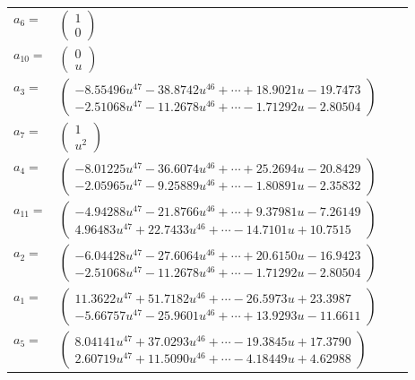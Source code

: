 \documentclass[1p]{elsarticle_modified}
\theoremstyle{definition}
\begin{document}
\begin{tabular}{m{7pt} m{180pt} m{7pt} m{180pt} }
\flushright $a_{6}=$&$\begin{pmatrix}1\\0\end{pmatrix}$ \\
\flushright $a_{10}=$&$\begin{pmatrix}0\\u\end{pmatrix}$ \\
\flushright $a_{3}=$&$\begin{pmatrix}-8.55496 u^{47}-38.8742 u^{46}+\cdots+18.9021 u-19.7473\\-2.51068 u^{47}-11.2678 u^{46}+\cdots-1.71292 u-2.80504\end{pmatrix}$ \\
\flushright $a_{7}=$&$\begin{pmatrix}1\\u^2\end{pmatrix}$ \\
\flushright $a_{4}=$&$\begin{pmatrix}-8.01225 u^{47}-36.6074 u^{46}+\cdots+25.2694 u-20.8429\\-2.05965 u^{47}-9.25889 u^{46}+\cdots-1.80891 u-2.35832\end{pmatrix}$ \\
\flushright $a_{11}=$&$\begin{pmatrix}-4.94288 u^{47}-21.8766 u^{46}+\cdots+9.37981 u-7.26149\\4.96483 u^{47}+22.7433 u^{46}+\cdots-14.7101 u+10.7515\end{pmatrix}$ \\
\flushright $a_{2}=$&$\begin{pmatrix}-6.04428 u^{47}-27.6064 u^{46}+\cdots+20.6150 u-16.9423\\-2.51068 u^{47}-11.2678 u^{46}+\cdots-1.71292 u-2.80504\end{pmatrix}$ \\
\flushright $a_{1}=$&$\begin{pmatrix}11.3622 u^{47}+51.7182 u^{46}+\cdots-26.5973 u+23.3987\\-5.66757 u^{47}-25.9601 u^{46}+\cdots+13.9293 u-11.6611\end{pmatrix}$ \\
\flushright $a_{5}=$&$\begin{pmatrix}8.04141 u^{47}+37.0293 u^{46}+\cdots-19.3845 u+17.3790\\2.60719 u^{47}+11.5090 u^{46}+\cdots-4.18449 u+4.62988\end{pmatrix}$ \\

\end{tabular}
\end{document}
